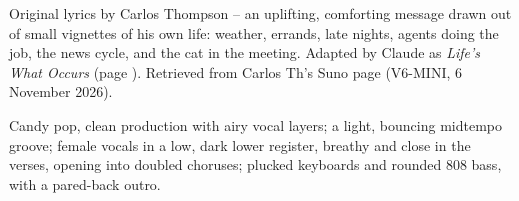 
\label{sec:lifes-what-happens}
\begin{notes}
Original lyrics by Carlos Thompson -- an uplifting, comforting message drawn out of small vignettes of his own life: weather, errands, late nights, agents doing the job, the news cycle, and the cat in the meeting. Adapted by Claude as \emph{Life's What Occurs} (page \pageref{sec:lifes-what-occurs}). Retrieved from Carlos Th's Suno page (V6-MINI, 6 November 2026).
\end{notes}
\begin{style}
Candy pop, clean production with airy vocal layers; a light, bouncing midtempo groove; female vocals in a low, dark lower register, breathy and close in the verses, opening into doubled choruses; plucked keyboards and rounded 808 bass, with a pared-back outro.
\end{style}
